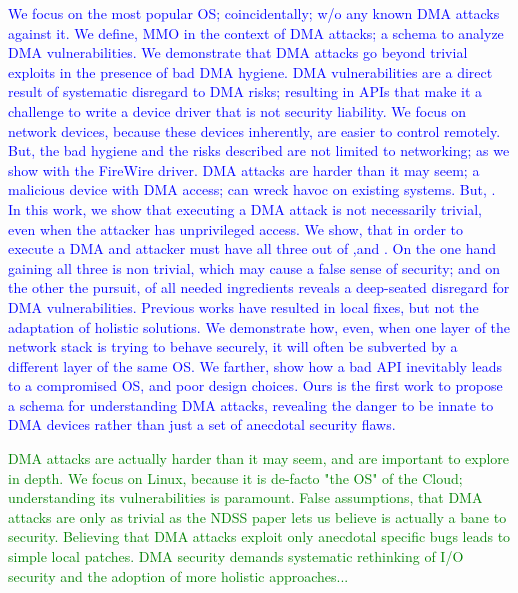\textcolor{blue}{

We focus on the most popular OS; coincidentally; w/o any known DMA attacks against it. We define, MMO in the context of DMA attacks; a schema to analyze DMA vulnerabilities. We demonstrate that DMA attacks go beyond trivial exploits in the presence of bad DMA hygiene. DMA vulnerabilities are a direct result of systematic disregard to DMA risks; resulting in APIs that make it a challenge to write a device driver that is not security liability. We focus on network devices, because these devices inherently, are easier to control remotely. But, the bad hygiene and the risks described are not limited to networking; as we show with the FireWire driver. DMA attacks are harder than it may seem; a malicious device with DMA access; can wreck havoc on existing systems. But, . In this work, we show that executing a DMA attack is not necessarily trivial, even when the attacker has unprivileged access. We show, that in order to execute a DMA and attacker must have all three out of \means,\motivation and \oportunity. On the one hand gaining all three is non trivial, which may cause a false sense of security; and on the other the pursuit, of all needed ingredients reveals a deep-seated disregard for DMA vulnerabilities. Previous works have resulted in local fixes, but not the adaptation of holistic solutions. We demonstrate how, even, when one layer of the network stack is trying to behave securely, it will often be subverted by a different layer of the same OS. We farther, show how a bad API inevitably leads to a compromised OS, and poor design choices. Ours is the first work to propose a schema for understanding DMA attacks, revealing the danger to be innate to DMA devices rather than just a set of anecdotal security flaws.}
\textcolor{green}{DMA attacks are actually harder than it may seem, and are important to explore in depth. We focus on Linux, because it is de-facto "the OS" of the Cloud; understanding its vulnerabilities is paramount. False assumptions, that DMA attacks are only as trivial as the NDSS paper lets us believe is actually a bane to security. Believing that DMA attacks exploit only anecdotal specific bugs leads to simple local patches. DMA security demands systematic rethinking of I/O security and the adoption of more holistic approaches...}
